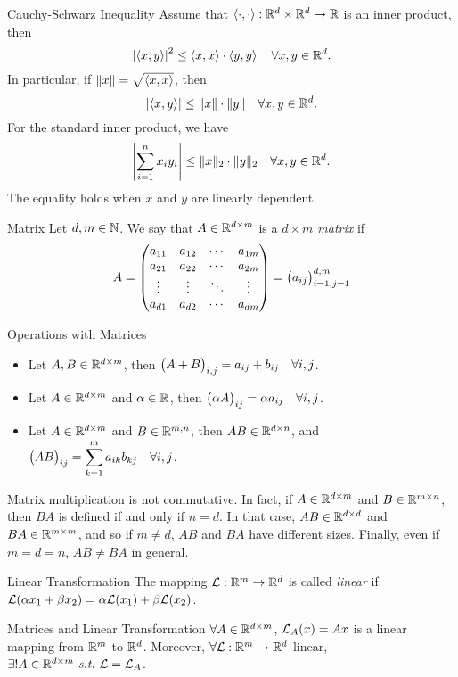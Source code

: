 \begin{thm}{Cauchy-Schwarz Inequality}
	Assume that $\left\langle \cdot, \cdot \right\rangle:{\mathbb{R}}^d\times{\mathbb{R}}^d\to{\mathbb{R}}$ is an inner product, then \[\qty|\left\langle x, y \right\rangle|^2\leq\left\langle x, x \right\rangle\cdot\left\langle y, y \right\rangle\quad\forall x,y\in{\mathbb{R}}^d.\] In particular, if $\|x\|=\sqrt{\left\langle x, x \right\rangle}$, then \[\qty|\left\langle x, y \right\rangle|\leq\|x\|\cdot\|y\|\quad\forall x,y\in{\mathbb{R}}^d.\] For the standard inner product, we have \[\qty|\sum_{i=1}^nx_iy_i|\leq\|x\|_2\cdot\|y\|_2\quad\forall x,y\in{\mathbb{R}}^d.\] The equality holds when $x$ and $y$ are linearly dependent.
\end{thm}
\begin{df}{Matrix}
	Let $d,m\in\mathbb{N}$. We say that $A\in{\mathbb{R}}^{d\times m}$ is a \textit{$d\times m$ matrix} if \[A=\mqty(a_{11}&a_{12}&\cdots&a_{1m}\\a_{21}&a_{22}&\cdots&a_{2m}\\\vdots&\vdots&\ddots&\vdots\\a_{d1}&a_{d2}&\cdots&a_{dm})=\mqty(a_{ij})_{i=1,j=1}^{d,m}\]
\end{df}
\begin{df}{Operations with Matrices}
	\begin{itemize}
		\item Let $A,B\in{\mathbb{R}}^{d\times m}$, then $\mqty(A+B)_{i,j}=a_{ij}+b_{ij}\quad\forall i,j$.
		\item Let $A\in{\mathbb{R}}^{d\times m}$ and $\alpha\in{\mathbb{R}}$, then $\mqty(\alpha A)_{ij}=\alpha a_{ij}\quad\forall i,j$.
		\item Let $A\in{\mathbb{R}}^{d\times m}$ and $B\in{\mathbb{R}}^{m,n}$, then $AB\in{\mathbb{R}}^{d\times n}$, and $\dsst\mqty(AB)_{ij}=\sum_{k=1}^ma_{ik}b_{kj}\quad\forall i,j$.
	\end{itemize}	
\end{df}
\begin{rmk}
	Matrix multiplication is not commutative. In fact, if $A\in{\mathbb{R}}^{d\times m}$ and $B\in{\mathbb{R}}^{m\times n}$, then $BA$ is defined if and only if $n=d$. In that case, $AB\in{\mathbb{R}}^{d\times d}$ and $BA\in{\mathbb{R}}^{m\times m}$, and so if $m\neq d$, $AB$ and $BA$ have different sizes. Finally, even if $m=d=n$, $AB\neq BA$ in general. 	
\end{rmk}
\begin{df}{Linear Transformation}
	The mapping $\mathcal{L}:{\mathbb{R}}^m\to{\mathbb{R}}^d$ is called \textit{linear} if $\mathcal{L}(\alpha x_1+\beta x_2)=\alpha\mathcal{L}(x_1)+\beta\mathcal{L}(x_2)$.	
\end{df}
\begin{thm}{Matrices and Linear Transformation}
	$\forall A\in{\mathbb{R}}^{d\times m}$, $\mathcal{L}_A(x)=Ax$ is a linear mapping from ${\mathbb{R}}^m$ to ${\mathbb{R}}^d$. Moreover, $\forall\mathcal{L}:{\mathbb{R}}^m\to{\mathbb{R}}^d$ linear, $\exists!A\in{\mathbb{R}}^{d\times m}\emph{\ s.t.\ }\mathcal{L}=\mathcal{L}_A$.
\end{thm}
